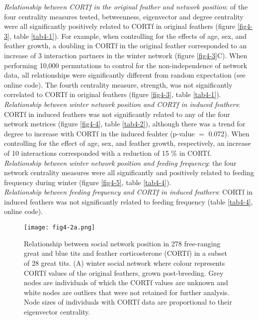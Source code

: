 \documentclass[10pt, twoside]{book} %
\begin{document}
\textit{Relationship between CORTf in the original feather and network position}: of the four centrality measures tested, betweenness, eigenvector and degree centrality were all significantly positively related to CORTf in original feathers (figure \ref{fig4-3}, table \ref{tab4-1}). For example, when controlling for the effects of age, sex, and feather growth, a doubling in CORTf in the original feather corresponded to an increase of 3 interaction partners in the winter network (figure \ref{fig4-3}C). When performing 10,000 permutations to control for the non-independence of network data, all relationships were significantly different from random expectation (see online code). The fourth centrality measure, strength, was not significantly correlated to CORTf in original feathers (figure \ref{fig4-3}, table \ref{tab4-1}).\\

\textit{Relationship between winter network position and CORTf in induced feathers}: CORTf in induced feathers was not significantly related to any of the four network metrices (figure \ref{fig4-4}, table \ref{tab4-2}),   although there was a trend for degree to increase with CORTf in the induced feahter (p-value $=$ 0.072). When controlling for the effect of age, sex, and feather growth, respectively, an increase of 10 interactions corresponded with a reduction of 15 \% in CORTf.\\

\textit{Relationship between winter network position and feeding frequency}: the four network centrality measures were all significantly and positively related to feeding frequency during winter (figure \ref{fig4-5}, table \ref{tab4-4}).\\

\textit{Relationship between feeding frequency and CORTf in induced feathers}: CORTf in induced feathers was not significantly related to feeding frequency (table \ref{tab4-4}, online code).\\


\begin{figure}[h!]
	\begin{center}
		\texttt{[image: fig4-2a.png]}
	\end{center}
	\caption{Relationship between social network position in 278 free-ranging great and blue tits and feather corticosterone (CORTf) in a subset of 28 great tits. (A) winter social network where colour represents CORTf values of the original feathers, grown post-breeding. Grey nodes are individuals of which the CORTf values are unknown and white nodes are outliers that were not retained for further analysis. Node sizes of individuals with CORTf data are proportional to their eigenvector centrality.}\label{fig4-2}
\end{figure}
\end{document}
